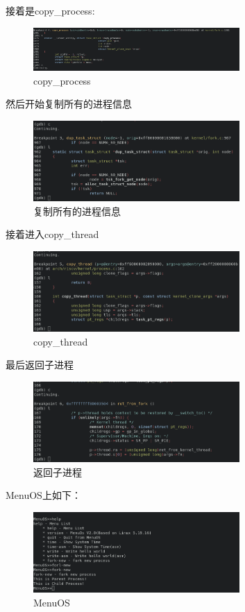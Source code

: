 \documentclass[lang=cn,10pt]{elegantbook}
\begin{document}
\newpage
接着是copy\_process:
\begin{figure}[htbp]
  \centering
  \includegraphics[width=0.7\textwidth]{image/image-20231107215857474.png}
  \caption{copy\_process}
\end{figure}

然后开始复制所有的进程信息
\begin{figure}[htbp]
  \centering
  \includegraphics[width=0.7\textwidth]{image/image-20231107214335881.png}
  \caption{复制所有的进程信息}
\end{figure}

接着进入copy\_thread
\begin{figure}[htbp]
  \centering
  \includegraphics[width=0.7\textwidth]{image/image-20231107214346193.png}
  \caption{copy\_thread}
\end{figure}


最后返回子进程
\begin{figure}[htbp]
  \centering
  \includegraphics[width=0.7\textwidth]{image/image-20231107214357751.png}
  \caption{返回子进程}
\end{figure}

\newpage
MenuOS上如下：
\begin{figure}[htbp]
  \centering
  \includegraphics[width=0.7\textwidth]{image/image-20231107214407872.png}
  \caption{MenuOS}
\end{figure}
\end{document}
